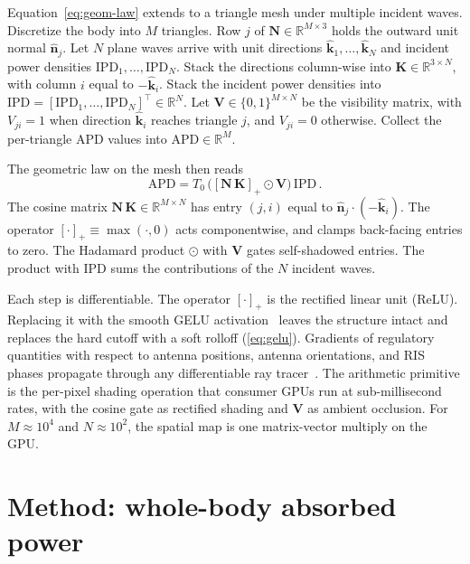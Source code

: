 \documentclass[journal,twocolumn,10pt]{IEEEtran}
\theoremstyle{plain}
\newcommand{\khat}{\hat{\bm{k}}}
\newcommand{\nhat}{\hat{\bm{n}}}
\newcommand{\IPD}{\mathrm{IPD}}
\newcommand{\pospart}[1]{\left[#1\right]_{+}}
\begin{document}
Equation~\eqref{eq:geom-law} extends to a triangle mesh under
multiple incident waves. Discretize the body into $M$ triangles. Row $j$ of
$\mathbf{N} \in \mathbb{R}^{M\times 3}$ holds the outward unit
normal $\nhat_j$. Let $N$ plane waves arrive with unit directions
$\khat_1, \ldots, \khat_N$ and incident power densities
$\IPD_1, \ldots, \IPD_N$.
Stack the directions column-wise into
$\mathbf{K} \in \mathbb{R}^{3\times N}$, with column $i$ equal to
$-\khat_i$. Stack the incident power densities into
$\bm{\mathrm{IPD}} = [\IPD_1,\ldots,\IPD_N]^\top \in \mathbb{R}^N$. Let
$\mathbf{V} \in \{0,1\}^{M\times N}$ be the visibility matrix, with
$V_{ji} = 1$ when direction $\khat_i$ reaches triangle $j$, and
$V_{ji} = 0$ otherwise. Collect the per-triangle APD values into
$\bm{\mathrm{APD}} \in \mathbb{R}^{M}$.

The geometric law on the mesh then reads
\begin{equation}\label{eq:mat-multi}
  \bm{\mathrm{APD}} = T_0\,\bigl(\pospart{\mathbf{N}\,\mathbf{K}}
  \odot \mathbf{V}\bigr)\,\bm{\mathrm{IPD}}\, .
\end{equation}
The cosine matrix $\mathbf{N}\,\mathbf{K} \in \mathbb{R}^{M\times N}$
has entry $(j,i)$ equal to $\nhat_j\cdot(-\khat_i)$. The operator
$\pospart{\cdot} \equiv \max(\cdot,0)$ acts componentwise, and clamps
back-facing entries to zero. The Hadamard product $\odot$ with
$\mathbf{V}$ gates self-shadowed entries. The product with
$\bm{\mathrm{IPD}}$ sums the contributions of the $N$ incident waves.

Each step is differentiable. The operator $\pospart{\cdot}$ is the
rectified linear unit (ReLU). Replacing it with the smooth
\gls{GELU} activation~\cite{Hendrycks2016} leaves the structure
intact and replaces the hard cutoff with a soft rolloff
(\cref{eq:gelu}). Gradients of regulatory quantities with respect to
antenna positions, antenna orientations, and RIS phases propagate
through any differentiable ray tracer~\cite{SionnaRT}. The arithmetic
primitive is the per-pixel shading operation that consumer GPUs run
at sub-millisecond rates, with the cosine gate as rectified shading
and $\mathbf{V}$ as ambient occlusion. For $M \approx 10^4$ and
$N \approx 10^2$, the spatial map is one matrix-vector multiply on
the GPU.

\section{Method: whole-body absorbed power}\label{sec:cauchy}
\end{document}
